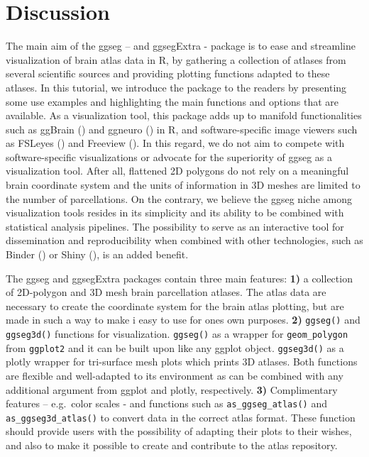 \documentclass[fleqn,10pt]{wlpeerj} %
\begin{document}
\hypertarget{discussion}{%
\section{Discussion}\label{discussion}}

The main aim of the ggseg -- and ggsegExtra - package is to ease and streamline visualization of brain atlas data in R, by gathering a collection of atlases from several scientific sources and providing plotting functions adapted to these atlases.
In this tutorial, we introduce the package to the readers by presenting some use examples and highlighting the main functions and options that are available.
As a visualization tool, this package adds up to manifold functionalities such as ggBrain (\citet{ggBrain}) and ggneuro (\citet{ggneuro}) in R, and software-specific image viewers such as FSLeyes (\citet{fsleyes}) and Freeview (\citet{dale_99}).
In this regard, we do not aim to compete with software-specific visualizations or advocate for the superiority of ggseg as a visualization tool.
After all, flattened 2D polygons do not rely on a meaningful brain coordinate system and the units of information in 3D meshes are limited to the number of parcellations.
On the contrary, we believe the ggseg niche among visualization tools resides in its simplicity and its ability to be combined with statistical analysis pipelines.
The possibility to serve as an interactive tool for dissemination and reproducibility when combined with other technologies, such as Binder (\citet{binder}) or Shiny (\citet{shiny}), is an added benefit.

The ggseg and ggsegExtra packages contain three main features:
\textbf{1)} a collection of 2D-polygon and 3D mesh brain parcellation atlases. The atlas data are necessary to create the coordinate system for the brain atlas plotting, but are made in such a way to make i easy to use for ones own purposes.
\textbf{2)} \texttt{ggseg()} and \texttt{ggseg3d()} functions for visualization.
\texttt{ggseg()} as a wrapper for \texttt{geom\_polygon} from \texttt{ggplot2} and it can be built upon like any ggplot object.
\texttt{ggseg3d()} as a plotly wrapper for tri-surface mesh plots which prints 3D atlases.
Both functions are flexible and well-adapted to its environment as can be combined with any additional argument from ggplot and plotly, respectively.
\textbf{3)} Complimentary features -- e.g.~color scales - and functions such as \texttt{as\_ggseg\_atlas()} and \texttt{as\_ggseg3d\_atlas()} to convert data in the correct atlas format. These function should provide users with the possibility of adapting their plots to their wishes, and also to make it possible to create and contribute to the atlas repository.
\end{document}
